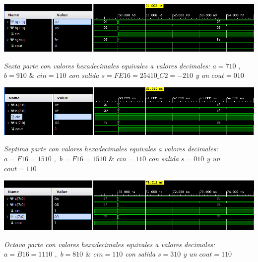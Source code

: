 \documentclass[12pt,executivepaper]{article}
\begin{document}
\begin{flushleft}
	\includegraphics[scale=0.52]{imgs/sexta.png}
\end{flushleft}
\begin{center}
    \textit{Sexta parte con valores hexadecimales equivales a valores decimales: $a=7{\scriptscriptstyle10}$ $,$ $b=9{\scriptscriptstyle10}$ $\&$ $cin=1{\scriptscriptstyle10}$ con salida $s =FE{\scriptscriptstyle16}=254{\scriptscriptstyle10\_C2}=-2{\scriptscriptstyle10}$ y un $cout=0{\scriptscriptstyle10}$}
\end{center}

\begin{flushleft}
	\includegraphics[scale=0.52]{imgs/septima.png}
\end{flushleft}
\begin{center}
    \textit{Septima parte con valores hexadecimales equivales a valores decimales: $a=F{\scriptscriptstyle16}=15{\scriptscriptstyle10}$ $,$ $b=F{\scriptscriptstyle16}=15{\scriptscriptstyle10}$ $\&$ $cin=1{\scriptscriptstyle10}$ con salida $s =0{\scriptscriptstyle10}$ y un $cout=1{\scriptscriptstyle10}$}
\end{center}

\begin{flushleft}
	\includegraphics[scale=0.52]{imgs/octava.png}
\end{flushleft}
\begin{center}
    \textit{Octava parte con valores hexadecimales equivales a valores decimales: $a=B{\scriptscriptstyle16}=11{\scriptscriptstyle10}$ $,$ $b=8{\scriptscriptstyle10}$ $\&$ $cin=1{\scriptscriptstyle10}$ con salida $s =3{\scriptscriptstyle10}$ y un $cout=1{\scriptscriptstyle10}$}
\end{center}
\end{document}
